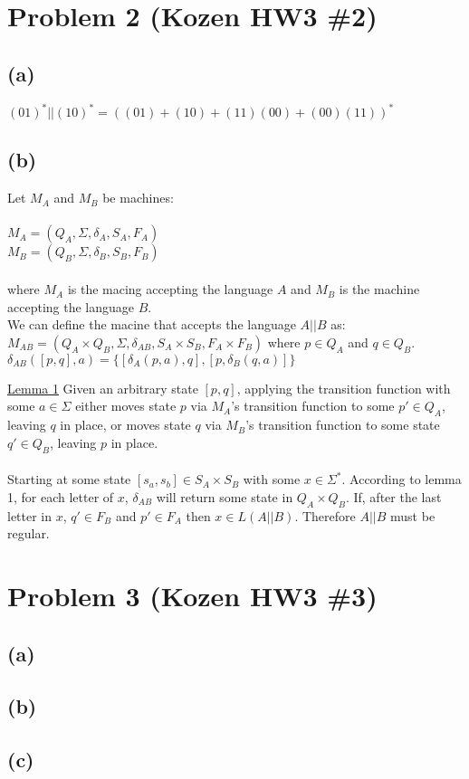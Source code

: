 \documentclass[11pt, a4paper, oneside]{article}
\begin{document}
\section*{Problem 2 (Kozen HW3 \#2)}
\subsection*{(a)}
$(01)^* || (10)^* = ((01) + (10) + (11)(00) + (00)(11))^*$

\subsection*{(b)}
Let $M_A$ and $M_B$ be machines: \\
\\
$M_A = (Q_A, \Sigma, \delta _A, S_A, F_A)$\\
$M_B = (Q_B, \Sigma, \delta _B, S_B, F_B)$\\
\\
where $M_A$ is the macing accepting the language $A$ and $M_B$ is the machine
accepting the language $B$. \\
We can define the macine that accepts the language $A||B$ as: \\

$M_{AB} = (Q_A \times Q_B, \Sigma, \delta _{AB}, S_A \times S_B, F_A \times F_B)$ 
where $p \in Q_A$ and $q \in Q_B$. \\

$\delta _{AB} ([p,q],a) = \{[\delta _A (p,a),q],[p, \delta _B (q,a)]\}$

\underline{Lemma 1}
Given an arbitrary state $[p,q]$, applying the transition function with 
some $a \in \Sigma$ either moves state $p$ via $M_A$'s transition function
to some $p' \in Q_A$, leaving $q$ in place, or moves state $q$ via $M_B$'s
transition function to some state $q' \in Q_B$, leaving $p$ in place.\\
\\
Starting at some state $[s_a, s_b] \in S_A \times S_B$ with some $x \in \Sigma^*$.
According to lemma 1, for each letter of $x$, $\delta _{AB}$ will return some 
state in $Q_A \times Q_B$. If, after the last letter in $x$, $q' \in F_B$ and 
$p' \in F_A$ then $x \in L(A||B)$. Therefore $A||B$ must be regular.


\section*{Problem 3 (Kozen HW3 \#3)}
\subsection*{(a)}

\subsection*{(b)}

\subsection*{(c)}
\end{document}
